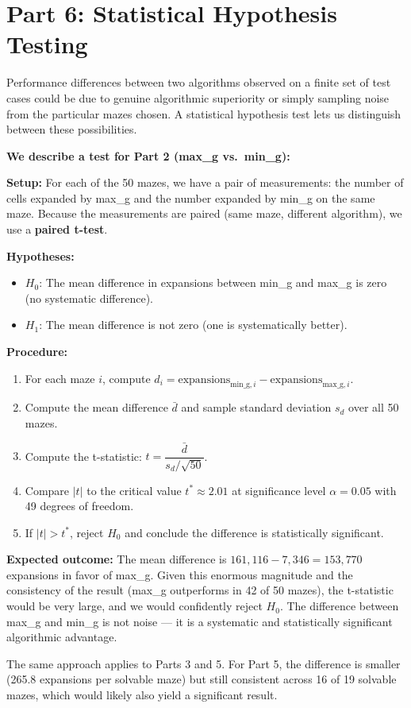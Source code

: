 \documentclass[12pt]{article}
\begin{document}
\section*{Part 6: Statistical Hypothesis Testing}

Performance differences between two algorithms observed on a finite set of test cases could be due to genuine algorithmic superiority or simply sampling noise from the particular mazes chosen. A statistical hypothesis test lets us distinguish between these possibilities.

\textbf{We describe a test for Part 2 (max\_g vs.\ min\_g):}

\textbf{Setup:} For each of the 50 mazes, we have a pair of measurements: the number of cells expanded by max\_g and the number expanded by min\_g on the same maze. Because the measurements are paired (same maze, different algorithm), we use a \textbf{paired t-test}.

\textbf{Hypotheses:}
\begin{itemize}
  \item $H_0$: The mean difference in expansions between min\_g and max\_g is zero (no systematic difference).
  \item $H_1$: The mean difference is not zero (one is systematically better).
\end{itemize}

\textbf{Procedure:}
\begin{enumerate}
  \item For each maze $i$, compute $d_i = \text{expansions}_{\text{min\_g},i} - \text{expansions}_{\text{max\_g},i}$.
  \item Compute the mean difference $\bar{d}$ and sample standard deviation $s_d$ over all 50 mazes.
  \item Compute the t-statistic: $t = \dfrac{\bar{d}}{s_d / \sqrt{50}}$.
  \item Compare $|t|$ to the critical value $t^* \approx 2.01$ at significance level $\alpha = 0.05$ with 49 degrees of freedom.
  \item If $|t| > t^*$, reject $H_0$ and conclude the difference is statistically significant.
\end{enumerate}

\textbf{Expected outcome:} The mean difference is $161{,}116 - 7{,}346 = 153{,}770$ expansions in favor of max\_g. Given this enormous magnitude and the consistency of the result (max\_g outperforms in 42 of 50 mazes), the t-statistic would be very large, and we would confidently reject $H_0$. The difference between max\_g and min\_g is not noise --- it is a systematic and statistically significant algorithmic advantage.

The same approach applies to Parts 3 and 5. For Part 5, the difference is smaller (265.8 expansions per solvable maze) but still consistent across 16 of 19 solvable mazes, which would likely also yield a significant result.
\end{document}
